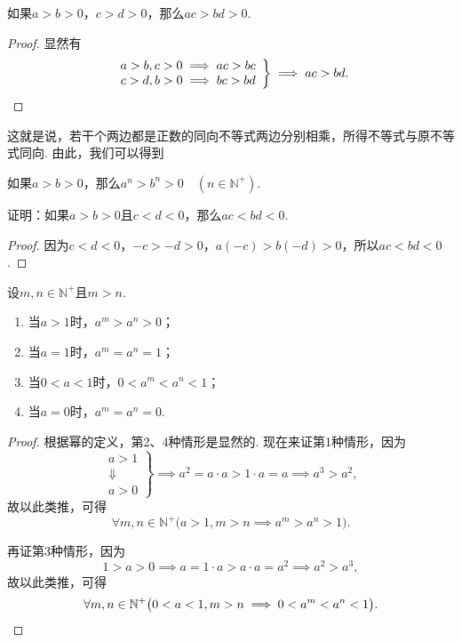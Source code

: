 \begin{corollary}
如果\(a>b>0\)，\(c>d>0\)，那么\(ac>bd>0\).
\begin{proof}
显然有\[
\left. \begin{array}{r}
a>b,c>0 \implies ac>bc \\
c>d,b>0 \implies bc>bd
\end{array} \right\}
\implies ac>bd.
\qedhere
\]
\end{proof}
\end{corollary}
这就是说，若干个两边都是正数的同向不等式两边分别相乘，所得不等式与原不等式同向.
由此，我们可以得到
\begin{corollary}
如果\(a>b>0\)，那么\(a^n>b^n>0 \quad (n\in\mathbb{N}^+)\).
\end{corollary}

\begin{example}
证明：如果\(a > b > 0\)且\(c < d < 0\)，那么\(ac < bd < 0\).
\begin{proof}
因为\(c < d < 0\)，\(-c > -d > 0\)，\(a(-c) > b(-d) > 0\)，所以\(ac < bd < 0\).
\end{proof}
\end{example}

\begin{corollary}\label{corollary:不等式.正整数次幂的序}
设\(m,n\in\mathbb{N}^+\)且\(m>n\).
\begin{enumerate}
\item 当\(a>1\)时，\(a^m > a^n > 0\)；
\item 当\(a=1\)时，\(a^m = a^n = 1\)；
\item 当\(0<a<1\)时，\(0 < a^m < a^n < 1\)；
\item 当\(a=0\)时，\(a^m = a^n = 0\).
\end{enumerate}
\begin{proof}
根据幂的定义，第2、4种情形是显然的.
现在来证第1种情形，因为\[
\left. \begin{array}{c}
a>1 \\
\Downarrow \\
a>0
\end{array} \right\}
\implies
a^2 = a \cdot a > 1 \cdot a = a
\implies
a^3 > a^2,
\]故以此类推，可得\[
\forall m,n\in\mathbb{N}^+ \bigl(
	a>1,m>n \implies a^m > a^n > 1
\bigr).
\]

再证第3种情形，因为\[
1>a>0
\implies
a = 1 \cdot a > a \cdot a = a^2
\implies
a^2 > a^3,
\]故以此类推，可得\[
\forall m,n\in\mathbb{N}^+ \bigl(
	0<a<1,m>n \implies 0 < a^m < a^n < 1
\bigr).
\qedhere
\]
\end{proof}
\end{corollary}

